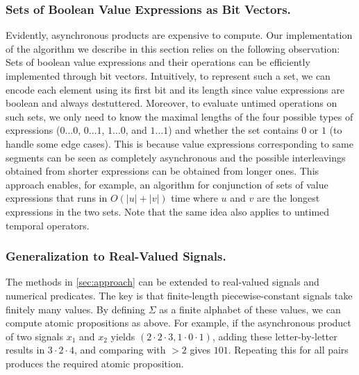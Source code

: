 \subsubsection{Sets of Boolean Value Expressions as Bit Vectors.}
Evidently, asynchronous products are expensive to compute.
Our implementation of the algorithm we describe in this section relies on the following observation:
Sets of boolean value expressions and their operations can be efficiently implemented through bit vectors.
Intuitively, to represent such a set, we can encode each element using its first bit and its length since value expressions are boolean and always destuttered.
Moreover, to evaluate untimed operations on such sets, we only need to know the maximal lengths of the four possible types of expressions ($0 \ldots 0$, $0 \ldots 1$, $1 \ldots 0$, and $1 \ldots 1$) and whether the set contains $0$ or $1$ (to handle some edge cases).
This is because value expressions corresponding to same segments can be seen as completely asynchronous and the possible interleavings obtained from shorter expressions can be obtained from longer ones.
This approach enables, for example, an algorithm for conjunction of sets of value expressions that runs in $O(|u| + |v|)$ time where $u$ and $v$ are the longest expressions in the two sets.
Note that the same idea also applies to untimed temporal operators.


\subsubsection{Generalization to Real-Valued Signals.}
The methods in \cref{sec:approach} can be extended to real-valued signals and numerical predicates.
The key is that finite-length piecewise-constant signals take finitely many values.
By defining $\Sigma$ as a finite alphabet of these values, we can compute atomic propositions as above.
For example, if the asynchronous product of two signals $x_1$ and $x_2$ yields $(2\cdot2\cdot3, 1\cdot0\cdot1)$, adding these letter-by-letter results in $3 \cdot 2 \cdot 4$, and comparing with $> 2$ gives $101$. Repeating this for all pairs produces the required atomic proposition.

